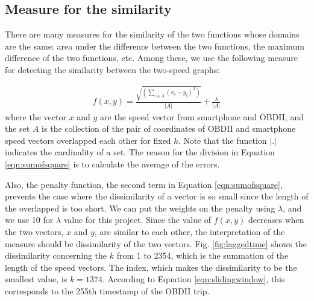 \documentclass[letterpaper,9pt,twocolumn,twoside,]{pinp}
\begin{document}
\hypertarget{measure-for-the-similarity}{%
\subsection{Measure for the
similarity}\label{measure-for-the-similarity}}

There are many measures for the similarity of the two functions whose
domains are the same: area under the difference between the two
functions, the maximum difference of the two functions, etc. Among
these, we use the following measure for detecting the similarity between
the two-speed graphs:

\begin{equation}
  \begin{aligned}
 f(x, y) = \frac{\sqrt{\left(\sum_{i\in A}\left(x_{i}-y_{i}\right)^{2}\right)}}{|A|} + \frac{\lambda}{|A|}
  \label{eqn:sumofsquare} 
  \end{aligned}
\end{equation} where the vector \(x\) and \(y\) are the speed vector
from smartphone and OBDII, and the set \(A\) is the collection of the
pair of coordinates of OBDII and smartphone speed vectors overlapped
each other for fixed \(k\). Note that the function \(|.|\) indicates the
cardinality of a set. The reason for the division in Equation
\ref{eqn:sumofsquare} is to calculate the average of the errors.

Also, the penalty function, the second term in Equation
\ref{eqn:sumofsquare}, prevents the case where the dissimilarity of a
vector is so small since the length of the overlapped is too short. We
can put the weights on the penalty using \(\lambda\), and we use 10 for
\(\lambda\) value for this project. Since the value of \(f(x, y)\)
decreases when the two vectors, \(x\) and \(y\), are similar to each
other, the interpretation of the measure should be dissimilarity of the
two vectors. Fig. \ref{fig:laggedtime} shows the dissimilarity
concerning the \(k\) from 1 to 2354, which is the summation of the
length of the speed vectors. The index, which makes the dissimilarity to
be the smallest value, is \(k = 1374\). According to Equation
\ref{eqn:slidingwindow}, this corresponds to the 255th timestamp of the
OBDII trip.
\end{document}
